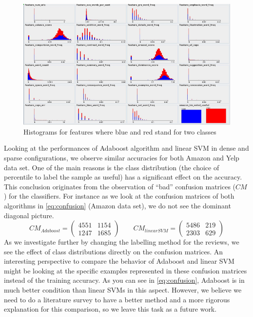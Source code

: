 \documentclass[letterpaper]{article}
\begin{document}
\begin{figure}[ht]
  \centering
  \includegraphics[scale=.5]{features_distributions}
  \caption{Histograms for features where blue and red stand for two classes}
  \label{fig:dist}
\end{figure}

Looking at the performances of Adaboost algorithm and linear SVM in
dense and sparse configurations, we observe similar accuracies for
both Amazon and Yelp data set. One of the main
reasons is the class distribution (the choice of percentile to
label the sample as useful) has a significant
effect on the accuracy. This conclusion originates from the
observation of ``bad'' confusion matrices ($CM$) for the classifiers. For
instance as we look at the confusion matrices of both algorithms in
\ref{eq:confusion} (Amazon data set), we do not see the dominant diagonal
picture. 
\begin{equation}
\label{eq:confusion}
CM_{Adaboost} = \left(
\begin{matrix}
4551 & 1154\\
1247 & 1685
\end{matrix}
\right)
\qquad
CM_{linearSVM} = \left(
\begin{matrix}
5486 & 219\\
2303 & 629
\end{matrix}
\right)
\end{equation}
As we investigate further by changing the labelling method
for the reviews, we see the effect of class distributions directly on
the confusion matrices. An interesting perspective to compare the
behavior of Adaboost and linear SVM might be looking at the specific
examples represented in these confusion matrices instead of the training
accuracy. As you can see in \ref{eq:confusion}, Adaboost is in much
better condition than linear SVMs in this aspect. However, we believe
we need to do a literature survey to have a better method and a more
rigorous explanation
for this comparison, so we leave this task as a future work.
\end{document}
